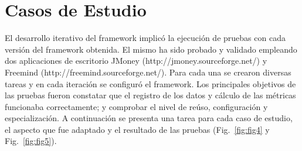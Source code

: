 \section{Casos de Estudio}
\label{sec:casos_de_estudio}
 
 El desarrollo iterativo del framework implicó la ejecución de pruebas con cada versión del framework obtenida. El mismo ha sido probado y validado empleando dos aplicaciones de escritorio JMoney (http://jmoney.sourceforge.net/) y Freemind (http://freemind.sourceforge.net/). 
%
%
%
%
Para cada una se crearon diversas tareas y en cada iteración se configuró el framework. Los principales objetivos de las pruebas fueron constatar que el registro de los datos y cálculo de las métricas funcionaba correctamente; y comprobar el nivel de reúso, configuración y especialización. A continuación se presenta una tarea para cada caso de estudio, el aspecto que fue adaptado  y el resultado de las pruebas (Fig.~\ref{fig:fig4} y Fig.~\ref{fig:fig5}).

